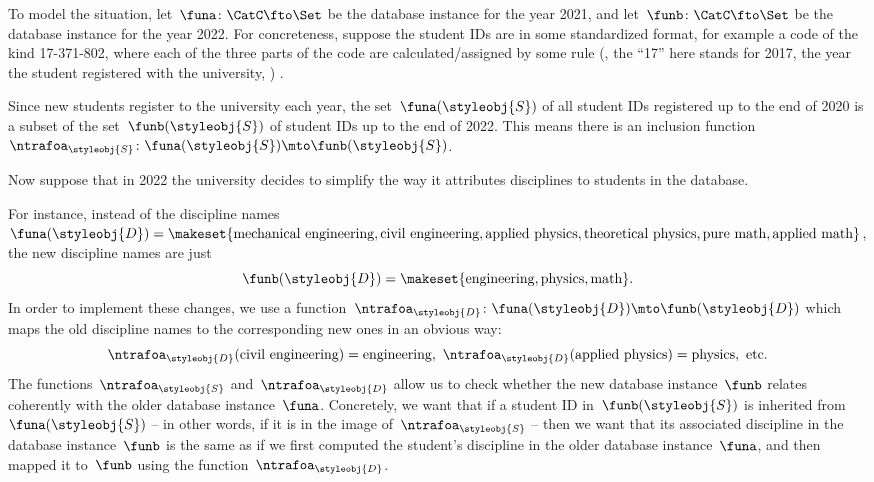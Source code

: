 To model the situation, let~$\funa \colon \CatC \fto \Set$ be the database instance for the year 2021, and let~$\funb \colon \CatC \fto \Set$ be the database instance for the year 2022.
For concreteness, suppose the student IDs are in some standardized format, for example a code of the kind 17-371-802, where each of the three parts of the code are calculated/assigned by some rule (, the ``17'' here stands for 2017, the year the student registered with the university, \etc)
.

Since new students register to the university each year, the set~$\funa(\styleobj{S})$ of all student IDs registered up to the end of 2020 is a subset of the set~$\funb(\styleobj{S})$ of student IDs up to the end of 2022.
This means there is an inclusion function~$\ntrafoa_{\styleobj{S}} \colon \funa(\styleobj{S}) \mto \funb(\styleobj{S})$.

Now suppose that in 2022 the university decides to simplify the way it attributes disciplines to students in the database.

For instance, instead of the discipline names~$\funa(\styleobj{D}) = \makeset{ \text{mechanical engineering}, \text{civil}\ \text{engineering}, \text{applied}\ \text{physics}, \text{theoretical}\ \text{physics}, \text{pure}\ \text{math}, \linebreak[1]\text{applied}\ \text{math} }$, the new discipline names are just
%
\begin{equation}
    \funb(\styleobj{D}) = \makeset{ \text{engineering}, \text{physics}, \text{math} }.
\end{equation}
%
In order to implement these changes, we use a function~$\ntrafoa_{\styleobj{D}}\colon \funa(\styleobj{D}) \mto \funb(\styleobj{D})$ which maps the old discipline names to the corresponding new ones in an obvious way:
\begin{equation}
    \ntrafoa_{\styleobj{D}}(\text{civil engineering}) = \text{engineering}, \ \ntrafoa_{\styleobj{D}}(\text{applied physics}) = \text{physics}, \ \text{etc.}
\end{equation}
The functions~$\ntrafoa_\styleobj{S}$ and~$\ntrafoa_\styleobj{D}$ allow us to check whether the new database instance~$\funb$ relates coherently with the older database instance~$\funa$.
Concretely, we want that if a student ID in~$\funb(\styleobj{S})$ is inherited from~$\funa(\styleobj{S})$ -- in other words, if it is in the image of~$\ntrafoa_{\styleobj{S}}$ -- then we want that its associated discipline in the database instance~$\funb$ is the same as if we first computed the student's discipline in the older database instance~$\funa$, and then mapped it to~$\funb$ using the function~$\ntrafoa_{\styleobj{D}}$.

